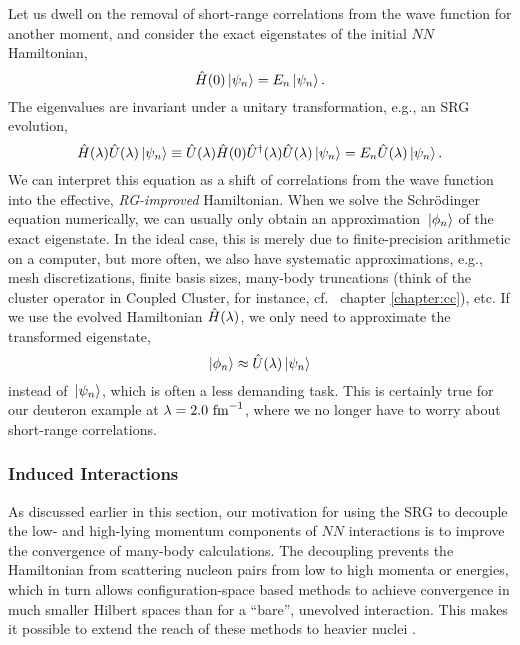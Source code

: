 {Let us dwell on the removal of short-range correlations from
the wave function for another moment, and consider the exact eigenstates of
the initial $NN$ Hamiltonian, 
\begin{equation}
  \hat{H}(0) \,|{\psi_n}\rangle = E_n \,|{\psi_n}\rangle\,.
\end{equation}
The eigenvalues are invariant under a unitary transformation, e.g.,
an SRG evolution,
\begin{equation}
  \hat{H}(\lambda)\hat{U}(\lambda)\,|{\psi_n}\rangle \equiv \hat{U}(\lambda) \hat{H}(0) \hat{U}^\dag(\lambda) \hat{U}(\lambda)\,|{\psi_n}\rangle 
    = E_n \hat{U}(\lambda) \,|{\psi_n}\rangle\,.
\end{equation}
We can interpret this equation as a shift of correlations from the
wave function into the effective, \emph{RG-improved} Hamiltonian. When
we solve the Schr\"odinger equation numerically, we can usually only
obtain an approximation $\,|{\phi_n}\rangle$ of the exact eigenstate. In 
the ideal case, this is merely due to finite-precision arithmetic on
a computer, but more often, we also have systematic approximations,
e.g., mesh discretizations, finite basis sizes, many-body truncations 
(think of the cluster operator in Coupled Cluster, for instance, cf.~
chapter \ref{chapter:cc}), etc.
If we use the evolved Hamiltonian $\hat{H}(\lambda)$, we only need 
to approximate the transformed eigenstate,
\begin{equation}\label{eq:approx_eigenstate}
  \ket{\phi_n}\approx\UO(\lambda)\ket{\psi_n}\,
\end{equation}
instead of $\,|{\psi_n}\rangle$, which is often a less demanding task.
This is certainly true for our deuteron example at $\lambda=2.0\,\,\text{fm}^{-1}$,
where we no longer have to worry about short-range correlations.

%
%
\subsubsection{\label{sec:srg_induced}Induced Interactions}

As discussed earlier in this section, our motivation for using the SRG to
decouple the low- and high-lying momentum components of $NN$ interactions 
is to improve the convergence of many-body calculations. The decoupling 
prevents the Hamiltonian from scattering nucleon pairs from low to high 
momenta or energies, which in turn allows configuration-space based methods 
to achieve convergence in much smaller Hilbert spaces than for a ``bare'',
unevolved interaction. This makes it possible to extend the reach of these
methods to heavier nuclei \cite{Roth:2011kx,Barrett:2013oq,Jurgenson:2013fk,Roth:2014fk,Hergert:2013ij,Hergert:2013mi,Hergert:2014vn,Hergert:2016jk,Hagen:2010uq,Roth:2012qf,Binder:2013zr,Binder:2014fk,Soma:2011vn,Soma:2013ys,Soma:2014fu,Soma:2014eu}.

}
